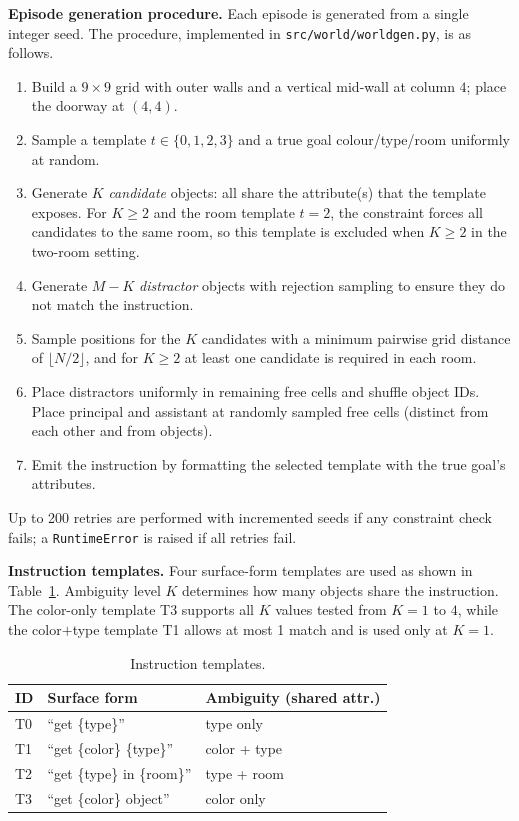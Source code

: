 \documentclass[10pt,twocolumn]{article}
\begin{document}
\textbf{Episode generation procedure.}
Each episode is generated from a single integer seed. The procedure, implemented in \texttt{src/world/worldgen.py}, is as follows.

\begin{enumerate}
\item Build a $9{\times}9$ grid with outer walls and a vertical mid-wall at column $4$; place the doorway at $(4,4)$.
\item Sample a template $t \in \{0,1,2,3\}$ and a true goal colour/type/room uniformly at random.
\item Generate $K$ \emph{candidate} objects: all share the attribute(s) that the template exposes. For $K{\geq}2$ and the room template $t{=}2$, the constraint forces all candidates to the same room, so this template is excluded when $K{\geq}2$ in the two-room setting.
\item Generate $M{-}K$ \emph{distractor} objects with rejection sampling to ensure they do not match the instruction.
\item Sample positions for the $K$ candidates with a minimum pairwise grid distance of $\lfloor N/2 \rfloor$, and for $K{\geq}2$ at least one candidate is required in each room.
\item Place distractors uniformly in remaining free cells and shuffle object IDs. Place principal and assistant at randomly sampled free cells (distinct from each other and from objects).
\item Emit the instruction by formatting the selected template with the true goal's attributes.
\end{enumerate}
Up to 200 retries are performed with incremented seeds if any constraint check fails; a \texttt{RuntimeError} is raised if all retries fail.

\textbf{Instruction templates.}
Four surface-form templates are used as shown in Table~\ref{tab:templates}. Ambiguity level $K$ determines how many objects share the instruction. The color-only template T3 supports all $K$ values tested from $K{=}1$ to $4$, while the color$+$type template T1 allows at most 1 match and is used only at $K{=}1$.

\begin{table}[h]
\centering
\caption{Instruction templates.}
\label{tab:templates}
\small
\begin{tabular}{llp{2.8cm}}
\toprule
ID & Surface form & Ambiguity (shared attr.) \\
\midrule
T0 & ``get \{type\}'' & type only \\
T1 & ``get \{color\} \{type\}'' & color + type \\
T2 & ``get \{type\} in \{room\}'' & type + room \\
T3 & ``get \{color\} object'' & color only \\
\bottomrule
\end{tabular}
\end{table}
\end{document}

